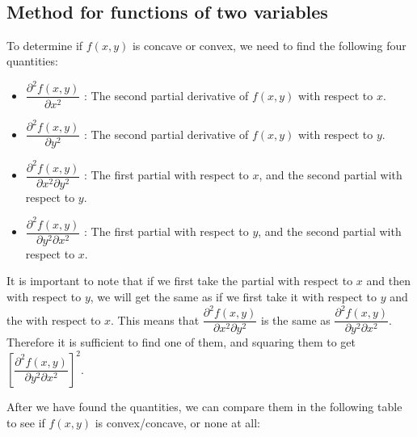 \documentclass[11pt]{article}
\providecommand{\tightlist}{%
      \setlength{\itemsep}{0pt}\setlength{\parskip}{0pt}}
\begin{document}
    \begin{center}
    \end{center}
    { \hspace*{\fill} \\}
    
    \hypertarget{method-for-functions-of-two-variables}{%
\subsection{Method for functions of two
variables}\label{method-for-functions-of-two-variables}}

    To determine if \(f(x,y)\) is concave or convex, we need to find the
following four quantities:

\begin{itemize}
\tightlist
\item
  \(\dfrac{\partial^2 f(x,y)}{\partial x^2}\) : The second partial
  derivative of \(f(x,y)\) with respect to \(x\).
\item
  \(\dfrac{\partial^2 f(x,y)}{\partial y^2}\) : The second partial
  derivative of \(f(x,y)\) with respect to \(y\).
\item
  \(\dfrac{\partial^2 f(x,y)}{\partial x^2 \partial y^2}\) : The first
  partial with respect to \(x\), and the second partial with respect to
  \(y\).
\item
  \(\dfrac{\partial^2 f(x,y)}{\partial y^2 \partial x^2}\) : The first
  partial with respect to \(y\), and the second partial with respect to
  \(x\).
\end{itemize}

    It is important to note that if we first take the partial with respect
to \(x\) and then with respect to \(y\), we will get the same as if we
first take it with respect to \(y\) and the with respect to \(x\). This
means that \(\dfrac{\partial^2 f(x,y)}{\partial x^2 \partial y^2}\) is
the same as \(\dfrac{\partial^2 f(x,y)}{\partial y^2 \partial x^2}\).
Therefore it is sufficient to find one of them, and squaring them to get
\(\left[\dfrac{\partial^2 f(x,y)}{\partial y^2 \partial x^2}\right]^2\).

After we have found the quantities, we can compare them in the following
table to see if \(f(x,y)\) is convex/concave, or none at all:
\end{document}
